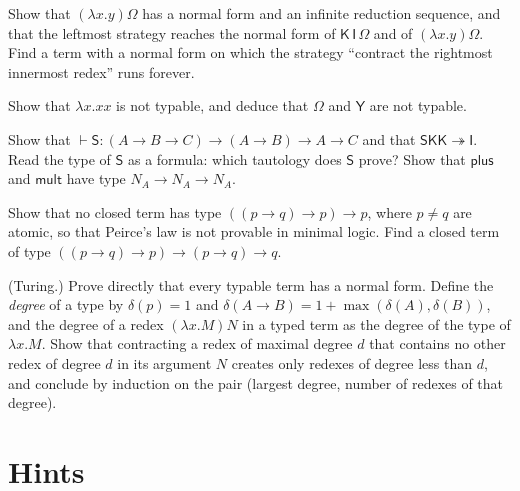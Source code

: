 \begin{exercise}[$\star\star$]\label{ex:strategies}
Show that $(\lambda x.y)\Omega$ has a normal form and an infinite reduction sequence, and that the leftmost strategy reaches the normal form of $\mathsf{K}\,\mathsf I\,\Omega$ and of $(\lambda x.y)\Omega$. Find a term with a normal form on which the strategy ``contract the rightmost innermost redex'' runs forever.
\end{exercise}

\begin{exercise}[$\star$]\label{ex:untypable}
Show that $\lambda x.xx$ is not typable, and deduce that $\Omega$ and $\mathsf Y$ are not typable.
\end{exercise}

\begin{exercise}[$\star\star$]\label{ex:types}
Show that $\vdash\mathsf S:(A\to B\to C)\to(A\to B)\to A\to C$ and that $\mathsf S\mathsf K\mathsf K\twoheadrightarrow\mathsf I$. Read the type of $\mathsf S$ as a formula: which tautology does $\mathsf S$ prove? Show that $\mathsf{plus}$ and $\mathsf{mult}$ have type $N_A\to N_A\to N_A$.
\end{exercise}

\begin{exercise}[$\star\star$]\label{ex:peirce}
Show that no closed term has type $((p\to q)\to p)\to p$, where $p\ne q$ are atomic, so that Peirce's law is not provable in minimal logic. Find a closed term of type $((p\to q)\to p)\to(p\to q)\to q$.
\end{exercise}

\begin{exercise}[$\star\star\star$]\label{ex:turingwn}
(Turing.) Prove directly that every typable term has a normal form. Define the \emph{degree} of a type by $\delta(p)=1$ and $\delta(A\to B)=1+\max(\delta(A),\delta(B))$, and the degree of a redex $(\lambda x.M)N$ in a typed term as the degree of the type of $\lambda x.M$. Show that contracting a redex of maximal degree $d$ that contains no other redex of degree $d$ in its argument $N$ creates only redexes of degree less than $d$, and conclude by induction on the pair (largest degree, number of redexes of that degree).
\end{exercise}

\section{Hints}

